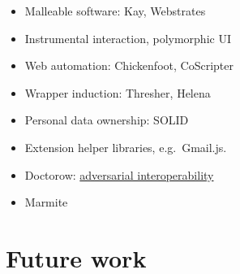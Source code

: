 \documentclass[english,submission]{programming}
\providecommand{\tightlist}{%
  \setlength{\itemsep}{0pt}\setlength{\parskip}{0pt}}
\begin{document}
\begin{itemize}
\tightlist
\item
  Malleable software: Kay, Webstrates
\item
  Instrumental interaction, polymorphic UI
\item
  Web automation: Chickenfoot, CoScripter
\item
  Wrapper induction: Thresher, Helena
\item
  Personal data ownership: SOLID
\item
  Extension helper libraries, e.g.~Gmail.js.
\item
  Doctorow:
  \href{https://www.eff.org/deeplinks/2019/10/adversarial-interoperability/}{adversarial
  interoperability}
\item
  Marmite
\end{itemize}

\hypertarget{future-work}{%
\section{Future work}\label{future-work}}
\end{document}
